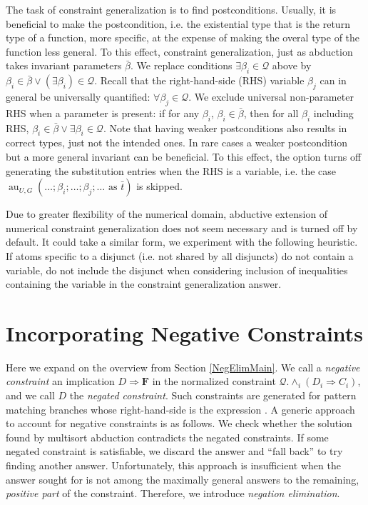 \documentclass{article}
\newcommand{\tmem}[1]{{\em #1\/}}
\newcommand{\tmmathbf}[1]{\ensuremath{\boldsymbol{#1}}}
\newcommand{\tmop}[1]{\ensuremath{\operatorname{#1}}}
\newcommand{\tmverbatim}[1]{{\ttfamily{#1}}}
\begin{document}
The task of constraint generalization is to find postconditions. Usually, it
is beneficial to make the postcondition, i.e. the existential type that is the
return type of a function, more specific, at the expense of making the overal
type of the function less general. To this effect, constraint generalization,
just as abduction takes invariant parameters $\bar{\beta}$. We replace
conditions $\exists \beta_i \in \mathcal{Q}$ above by $\beta_i \in \bar{\beta}
\vee (\exists \beta_i) \in \mathcal{Q}$. Recall that the right-hand-side (RHS)
variable $\beta_j$ can in general be universally quantified: $\forall \beta_j
\in \mathcal{Q}$. We exclude universal non-parameter RHS when a parameter is
present: if for any $\beta_i$, $\beta_i \in \bar{\beta}$, then for all
$\beta_i$ including RHS, $\beta_i \in \bar{\beta} \vee \exists \beta_i \in
\mathcal{Q}$. Note that having weaker postconditions also results in correct
types, just not the intended ones. In rare cases a weaker postcondition but a
more general invariant can be beneficial. To this effect, the option
\tmverbatim{-{\nobreak}more\_existential} turns off generating the
substitution entries when the RHS is a variable, i.e. the case $\tmop{au}_{U,
G} (\ldots ; \beta_i ; \ldots ; \beta_j ; \ldots \text{ as } \bar{t})$ is
skipped.

Due to greater flexibility of the numerical domain, abductive extension of
numerical constraint generalization does not seem necessary and is turned off
by default. It could take a similar form, we experiment with the following
heuristic. If atoms specific to a disjunct (i.e. not shared by all disjuncts)
do not contain a variable, do not include the disjunct when considering
inclusion of inequalities containing the variable in the constraint
generalization answer.

\section{Incorporating Negative Constraints}\label{NegElimAlg}

Here we expand on the overview from Section \ref{NegElimMain}. We call a
{\tmem{negative constraint}} an implication $D \Rightarrow \tmmathbf{F}$ in
the normalized constraint $\mathcal{Q}. \wedge_i (D_i \Rightarrow C_i)$, and
we call $D$ the {\tmem{negated constraint}}. Such constraints are generated
for pattern matching branches whose right-hand-side is the expression
\tmverbatim{assert false}. A generic approach to account for negative
constraints is as follows. We check whether the solution found by multisort
abduction contradicts the negated constraints. If some negated constraint is
satisfiable, we discard the answer and ``fall back'' to try finding another
answer. Unfortunately, this approach is insufficient when the answer sought
for is not among the maximally general answers to the remaining,
{\tmem{positive part}} of the constraint. Therefore, we introduce
{\tmem{negation elimination}}.
\end{document}

